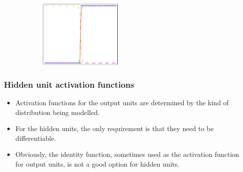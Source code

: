 \documentclass{beamer}
\begin{document}
\begin{frame}
\begin{figure}
\begin{subfigure}{0.7\textwidth}
            \includegraphics[width=0.45\textwidth]{Figure_10_d.pdf}
        \end{subfigure}
    \end{figure}
\end{frame}

\begin{frame}
    \frametitle{Hidden unit activation functions}
    \begin{itemize}
        \item Activation functions for the output units are determined by the kind of distribution being modelled.
        \item For the hidden units, the only requirement is that they need to be differentiable.
        \item Obviously, the identity function, sometimes used as the activation function for output units, is not a good option for hidden units.
    \end{itemize}
\end{frame}
\end{document}
